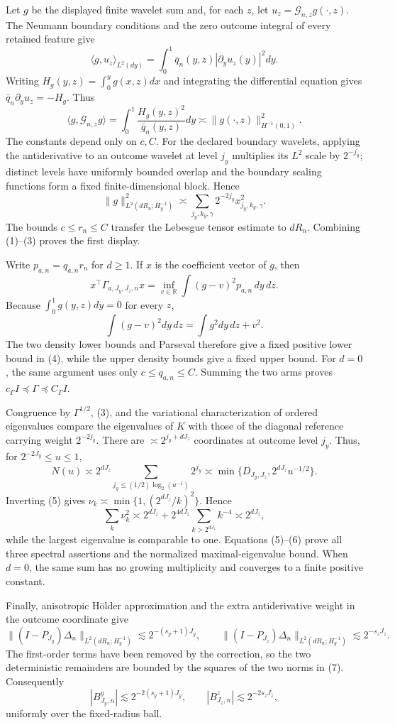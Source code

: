 Let \(g\) be the displayed finite wavelet sum and, for each \(z\), let \(u_z=\mathcal G_{n,z}g(\cdot,z)\). The Neumann boundary conditions and the zero outcome integral of every retained feature give
\[
\langle g,u_z\rangle_{L^2(dy)}
=\int_0^1\bar q_n(y,z)|\partial_yu_z(y)|^2dy.          \tag{1}
\]
Writing \(H_g(y,z)=\int_0^yg(x,z)dx\) and integrating the differential equation gives \(\bar q_n\partial_yu_z=-H_g\). Thus
\[
\langle g,\mathcal G_{n,z}g\rangle
=\int_0^1\frac{H_g(y,z)^2}{\bar q_n(y,z)}dy
\asymp \|g(\cdot,z)\|_{H^{-1}(0,1)}^2.               \tag{2}
\]
The constants depend only on \(c,C\). For the declared boundary wavelets, applying the antiderivative to an outcome wavelet at level \(j_y\) multiplies its \(L^2\) scale by \(2^{-j_y}\); distinct levels have uniformly bounded overlap and the boundary scaling functions form a fixed finite-dimensional block. Hence
\[
\|g\|_{L^2(dR_n;H^{-1}_y)}^2
\asymp\sum_{j_y,k_y,\gamma}2^{-2j_y}x_{j_y,k_y,\gamma}^2. \tag{3}
\]
The bounds \(c\le r_n\le C\) transfer the Lebesgue tensor estimate to \(dR_n\). Combining (1)--(3) proves the first display.

Write \(p_{a,n}=q_{a,n}r_n\) for \(d\ge1\). If \(x\) is the coefficient vector of \(g\), then
\[
x^\top\Gamma_{a,J_y,J_z,n}x
=\inf_{v\in\mathbb R}\int(g-v)^2p_{a,n}\,dy\,dz.       \tag{4}
\]
Because \(\int_0^1g(y,z)dy=0\) for every \(z\),
\[
\int(g-v)^2dy\,dz=\int g^2dy\,dz+v^2.
\]
The two density lower bounds and Parseval therefore give a fixed positive lower bound in (4), while the upper density bounds give a fixed upper bound. For \(d=0\), the same argument uses only \(c\le q_{a,n}\le C\). Summing the two arms proves \(c_\Gamma I\preceq\Gamma\preceq C_\Gamma I\).

Congruence by \(\Gamma^{1/2}\), (3), and the variational characterization of ordered eigenvalues compare the eigenvalues of \(K\) with those of the diagonal reference carrying weight \(2^{-2j_y}\). There are \(\asymp2^{j_y+dJ_z}\) coordinates at outcome level \(j_y\). Thus, for \(2^{-2J_y}\le u\le1\),
\[
N(u)\asymp 2^{dJ_z}\sum_{j_y\le(1/2)\log_2(u^{-1})}2^{j_y}
\asymp\min\{D_{J_y,J_z},2^{dJ_z}u^{-1/2}\}.           \tag{5}
\]
Inverting (5) gives \(\nu_k\asymp\min\{1,(2^{dJ_z}/k)^2\}\). Hence
\[
\sum_k\nu_k^2\asymp
2^{dJ_z}+2^{4dJ_z}\sum_{k>2^{dJ_z}}k^{-4}
\asymp2^{dJ_z},                                       \tag{6}
\]
while the largest eigenvalue is comparable to one. Equations (5)--(6) prove all three spectral assertions and the normalized maximal-eigenvalue bound. When \(d=0\), the same sum has no growing multiplicity and converges to a finite positive constant.

Finally, anisotropic H\"older approximation and the extra antiderivative weight in the outcome coordinate give
\[
\|(I-P_{J_y})\Delta_n\|_{L^2(dR_n;H_y^{-1})}
\lesssim2^{-(s_y+1)J_y},\qquad
\|(I-P_{J_z})\Delta_n\|_{L^2(dR_n;H_y^{-1})}
\lesssim2^{-s_zJ_z}.                                  \tag{7}
\]
The first-order terms have been removed by the correction, so the two deterministic remainders are bounded by the squares of the two norms in (7). Consequently
\[
|B^y_{J_y,n}|\lesssim2^{-2(s_y+1)J_y},
\qquad |B^z_{J_z,n}|\lesssim2^{-2s_zJ_z},
\]
uniformly over the fixed-radius ball.